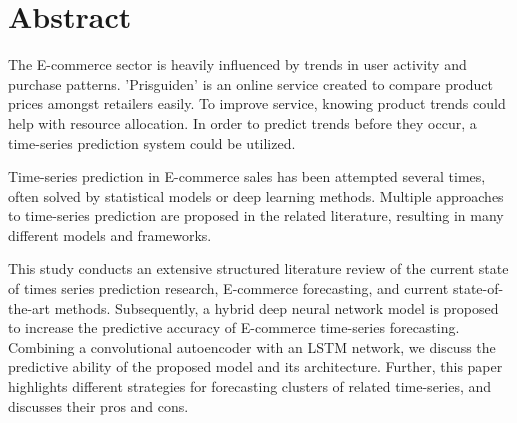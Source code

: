 \section*{Abstract}
\label{section:Abstract}

The E-commerce sector is heavily influenced by trends in user activity and purchase patterns.
'Prisguiden' is an online service created to compare product prices amongst retailers easily.
To improve service, knowing product trends could help with resource allocation.
In order to predict trends before they occur, a time-series prediction system could be utilized.

Time-series prediction in E-commerce sales has been attempted several times,
often solved by statistical models or deep learning methods.
Multiple approaches to time-series prediction are proposed in the related literature,
resulting in many different models and frameworks.

This study conducts an extensive structured literature review of the current state of times series prediction research, E-commerce forecasting,
and current state-of-the-art methods.
Subsequently, a hybrid deep neural network model is proposed to increase the predictive accuracy of E-commerce time-series forecasting.
Combining a convolutional autoencoder with an LSTM network, we discuss the predictive ability of the proposed model
and its architecture.
Further, this paper highlights different strategies for forecasting clusters of related time-series, and discusses their pros and cons.
